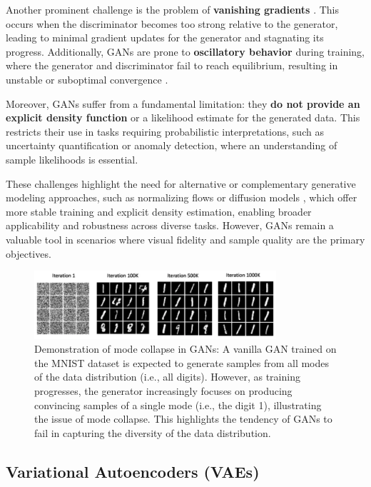 Another prominent challenge is the problem of \textbf{vanishing gradients} \citep{arjovsky2017wasserstein}. This occurs when the discriminator becomes too strong relative to the generator, leading to minimal gradient updates for the generator and stagnating its progress. Additionally, GANs are prone to \textbf{oscillatory behavior} during training, where the generator and discriminator fail to reach equilibrium, resulting in unstable or suboptimal convergence \citep{mescheder2018which}.

Moreover, GANs suffer from a fundamental limitation: they \textbf{do not provide an explicit density function} or a likelihood estimate for the generated data. This restricts their use in tasks requiring probabilistic interpretations, such as uncertainty quantification or anomaly detection, where an understanding of sample likelihoods is essential.

These challenges highlight the need for alternative or complementary generative modeling approaches, such as normalizing flows \citep{papamakarios2019normalizing} or diffusion models \citep{ho2020denoising}, which offer more stable training and explicit density estimation, enabling broader applicability and robustness across diverse tasks. However, GANs remain a valuable tool in scenarios where visual fidelity and sample quality are the primary objectives.

\begin{figure}[h!]
    \centering
    \includegraphics[width=0.8\textwidth]{introduction/figures/mode_collapse.png}
    \caption{Demonstration of mode collapse in GANs: A vanilla GAN trained on the MNIST dataset is expected to generate samples from all modes of the data distribution (i.e., all digits). However, as training progresses, the generator increasingly focuses on producing convincing samples of a single mode (i.e., the digit 1), illustrating the issue of mode collapse. This highlights the tendency of GANs to fail in capturing the diversity of the data distribution.}
    \label{fig:mode_collapse}
\end{figure}



\subsection{Variational Autoencoders (VAEs)}\label{sec:vae}

